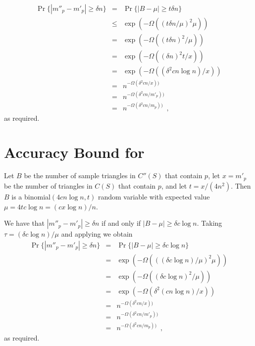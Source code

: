 \documentclass{patmorin}
\begin{document}
\begin{eqnarray*}
   \Pr\{ |m''_p - m'_p| \ge \delta n \}
   & = & \Pr\{ |B-\mu| \ge t \delta  n \} \\
   & \le & \exp(-\Omega(\left(t \delta  n /\mu\right)^2 \mu)) \\
   &  = & \exp(-\Omega((t \delta  n)^2/\mu)) \\
   &  = & \exp(-\Omega((\delta n)^2 t/x)) \\
   &  = & \exp(-\Omega((\delta^2 cn\log n)/x)) \\
   &  = & n^{-\Omega(\delta^2 cn/x))} \\
   &  = & n^{-\Omega(\delta^2 cn/m'_p))} \\
   &  = & n^{-\Omega(\delta^2 cn/m_p))} \enspace ,
\end{eqnarray*}
as required.

\section{Accuracy Bound for }

Let $B$ be the number of sample triangles in $C''(S)$ that contain $p$,
let $x=m'_p$ be the number of triangles in $C(S)$ that contain $p$, and
let $t=x / (4n^{2})$.  Then $B$ is a binomial$(4cn\log n,t)$ random
variable with expected value $\mu = 4tc\log n = (cx\log n) / n$.

We have that $|m''_p-m'_p|\ge \delta n$ if and only if $|B-\mu|\ge \delta c
\log n$.  Taking $\tau = (\delta c\log n)/\mu$ and applying
 we
obtain
\begin{eqnarray*}
  \Pr\{ |m''_p - m'_p| \ge \delta n \}
   & = & \Pr\{ |B-\mu| \ge \delta c \log n  \} \\
   & = & \exp(-\Omega(((\delta c\log n) / \mu)^2\mu)) \\
   & = & \exp(-\Omega((\delta c\log n)^2/\mu)) \\
   & = & \exp(-\Omega(\delta^2(cn\log n)/x)) \\
   & = & n^{-\Omega(\delta^2cn/x))} \\
   & = & n^{-\Omega(\delta^2cn/m'_p))} \\
   & = & n^{-\Omega(\delta^2cn/m_p))}  \enspace ,
\end{eqnarray*}
as required.
\end{document}
